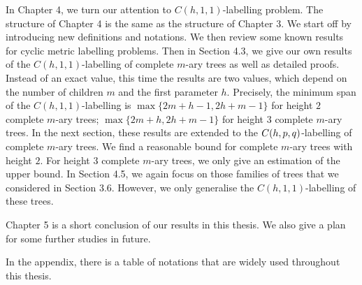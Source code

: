 In Chapter 4, we turn our attention to $C(h,1,1)$-labelling problem. The structure of Chapter 4 is the same as the structure of Chapter 3. We start off by introducing new definitions and notations. We then review some known results for cyclic metric labelling problems. Then in Section 4.3, we give our own results of the $C(h,1,1)$-labelling of complete $m$-ary trees as well as detailed proofs. Instead of an exact value, this time the results are two values, which depend on the number of children $m$ and the first parameter $h$. Precisely, the minimum span of the $C(h,1,1)$-labelling is $\max\{2m+h-1, 2h+m-1\}$ for height $2$ complete $m$-ary trees; $\max\{2m+h, 2h+m-1\}$ for height $3$ complete $m$-ary trees. In the next section, these results are extended to the $C(h,p,q)$-labelling of complete $m$-ary trees. We find a reasonable bound for complete $m$-ary trees with height $2$. For height $3$ complete $m$-ary trees, we only give an estimation of the upper bound. In Section 4.5, we again focus on those families of trees that we considered in Section 3.6. However, we only generalise the $C(h,1,1)$-labelling of these trees. 

Chapter 5 is a short conclusion of our results in this thesis. We also give a plan for some further studies in future. 

In the appendix, there is a table of notations that are widely used throughout this thesis. 








